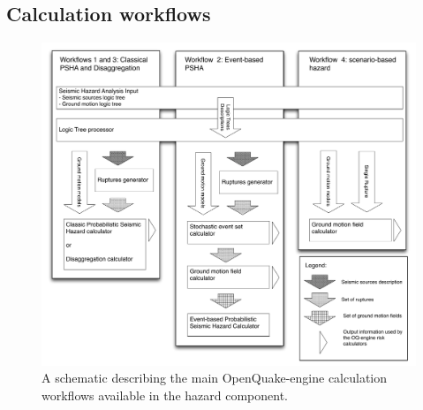 \subsection{Calculation workflows}
\label{sec:workflows}
\begin{figure}[!ht]
\centering
\includegraphics[width=14cm]{./Pictures/intro/fig02.pdf}
\caption{A schematic describing the main OpenQuake-engine calculation workflows 
available in the hazard component.}
\label{fig:oq_wf}
\end{figure}

